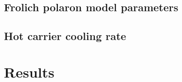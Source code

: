 
\subsection{Frolich polaron model parameters}
\subsection{Hot carrier cooling rate}


\section{Results}

